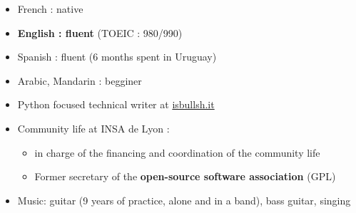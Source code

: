     \begin{itemize}
    \renewcommand{\labelitemi}{$\circ$}
    \item French : native
    \item \textbf{English : fluent} (TOEIC : 980/990)
    \item Spanish : fluent (6 months spent in Uruguay) 
    \item Arabic, Mandarin : begginer
\end{itemize}
    
\begin{itemize}
\renewcommand{\labelitemi}{$\circ$}
	\item Python focused technical writer at \href{http://isbullsh.it}{isbullsh.it}
	\item Community life at INSA de Lyon :
	\begin{itemize}
		\item in charge of the financing and coordination of the community life
		\item Former secretary of the \textbf{open-source software association} (GPL) 
	\end{itemize}
    \item Music: guitar (9 years of practice, alone and in a band), bass guitar, singing    
\end{itemize}


